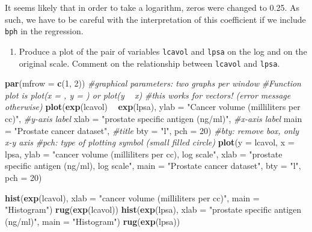 \documentclass[]{book}
\newenvironment{Shaded}{\begin{snugshade}}{\end{snugshade}}
\newcommand{\CommentTok}[1]{\textcolor[rgb]{0.56,0.35,0.01}{\textit{#1}}}
\newcommand{\DataTypeTok}[1]{\textcolor[rgb]{0.13,0.29,0.53}{#1}}
\newcommand{\DecValTok}[1]{\textcolor[rgb]{0.00,0.00,0.81}{#1}}
\newcommand{\KeywordTok}[1]{\textcolor[rgb]{0.13,0.29,0.53}{\textbf{#1}}}
\newcommand{\NormalTok}[1]{#1}
\newcommand{\OperatorTok}[1]{\textcolor[rgb]{0.81,0.36,0.00}{\textbf{#1}}}
\newcommand{\StringTok}[1]{\textcolor[rgb]{0.31,0.60,0.02}{#1}}
\providecommand{\tightlist}{%
  \setlength{\itemsep}{0pt}\setlength{\parskip}{0pt}}
\theoremstyle{definition}
\theoremstyle{definition}
\theoremstyle{definition}
\theoremstyle{remark}
\begin{document}
It seems likely that in order to take a logarithm, zeros were changed to
0.25. As such, we have to be careful with the interpretation of this
coefficient if we include \texttt{bph} in the regression.

\begin{enumerate}
\def\labelenumi{\alph{enumi}.}
\setcounter{enumi}{1}
\tightlist
\item
  Produce a plot of the pair of variables \texttt{lcavol} and
  \texttt{lpsa} on the log and on the original scale. Comment on the
  relationship between \texttt{lcavol} and \texttt{lpsa}.
\end{enumerate}

\begin{Shaded}
\begin{Highlighting}[]
\KeywordTok{par}\NormalTok{(}\DataTypeTok{mfrow =} \KeywordTok{c}\NormalTok{(}\DecValTok{1}\NormalTok{, }\DecValTok{2}\NormalTok{)) }\CommentTok{#graphical parameters: two graphs per window}
\CommentTok{#Function plot is plot(x = , y = ) or plot(y ~ x)}
\CommentTok{#this works for vectors! (error message otherwise)}
\KeywordTok{plot}\NormalTok{(}\KeywordTok{exp}\NormalTok{(lcavol) }\OperatorTok{~}\StringTok{ }\KeywordTok{exp}\NormalTok{(lpsa),}
\DataTypeTok{ylab =} \StringTok{"Cancer volume (milliliters per cc)"}\NormalTok{, }\CommentTok{#y-axis label}
\DataTypeTok{xlab =} \StringTok{"prostate specific antigen (ng/ml)"}\NormalTok{, }\CommentTok{#x-axis label}
\DataTypeTok{main =} \StringTok{"Prostate cancer dataset"}\NormalTok{, }\CommentTok{#title}
\DataTypeTok{bty =} \StringTok{"l"}\NormalTok{, }\DataTypeTok{pch =} \DecValTok{20}\NormalTok{) }\CommentTok{#bty: remove box, only x-y axis}
\CommentTok{#pch: type of plotting symbol (small filled circle)}
\KeywordTok{plot}\NormalTok{(}\DataTypeTok{y =}\NormalTok{ lcavol, }\DataTypeTok{x =}\NormalTok{ lpsa,}
\DataTypeTok{ylab =} \StringTok{"cancer volume (milliliters per cc), log scale"}\NormalTok{,}
\DataTypeTok{xlab =} \StringTok{"prostate specific antigen (ng/ml), log scale"}\NormalTok{, }
\DataTypeTok{main =} \StringTok{"Prostate cancer dataset"}\NormalTok{,}
\DataTypeTok{bty =} \StringTok{"l"}\NormalTok{, }\DataTypeTok{pch =} \DecValTok{20}\NormalTok{)}

\KeywordTok{hist}\NormalTok{(}\KeywordTok{exp}\NormalTok{(lcavol), }\DataTypeTok{xlab =} \StringTok{"cancer volume (milliliters per cc)"}\NormalTok{, }\DataTypeTok{main =} \StringTok{"Histogram"}\NormalTok{)}
\KeywordTok{rug}\NormalTok{(}\KeywordTok{exp}\NormalTok{(lcavol))}
\KeywordTok{hist}\NormalTok{(}\KeywordTok{exp}\NormalTok{(lpsa), }\DataTypeTok{xlab =} \StringTok{"prostate specific antigen (ng/ml)"}\NormalTok{, }\DataTypeTok{main =} \StringTok{"Histogram"}\NormalTok{)}
\KeywordTok{rug}\NormalTok{(}\KeywordTok{exp}\NormalTok{(lpsa))}
\end{Highlighting}
\end{Shaded}
\end{document}
